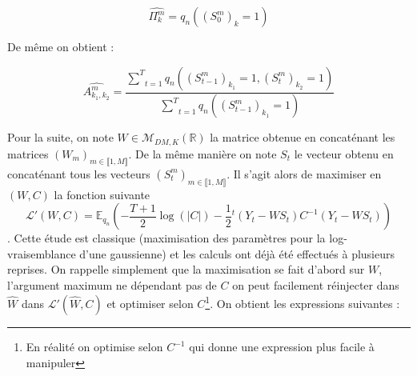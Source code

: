 \documentclass[10pt,a4paper]{article}
\begin{document}
\begin{equation}
  \widehat{\Pi_k^m}=q_{n}((S_0^m)_k=1)
\end{equation}

De même on obtient :

\begin{equation}
  \widehat{A_{k_1,k_2}^m}=\frac{\underset{t=1}{\overset{T}{\sum}}q_n((S_{t-1}^m)_{
  k_1}=1,(S_t^m)_{k_2}=1)}{\underset{t=1}{\overset{T}{\sum}}q_n((S_{t-1}^m)_{k_1}
  =1)}
\end{equation}

  Pour la suite, on note $W \in \mathcal{M}_{DM,K}(\mathbb{R})$ la matrice 
obtenue en concaténant les matrices $(W_m)_{m \in \llbracket 1,M \rrbracket}$. 
De la même manière on note $S_t$ le vecteur obtenu en concaténant tous les 
vecteurs $(S_t^m)_{m \in \llbracket 1,M \rrbracket}$.
Il s'agit alors de maximiser en $(W,C)$ la fonction suivante 
\[ \mathcal{L}'(W,C)=\mathbb{E}_{q_n}\left(-\frac{T+1}{2} \log(\vert C \vert) 
-\frac{1}{2} {}^t\left(Y_t-WS_t \right)C^{-1} \left( Y_t-WS_t\right)\right) \].
Cette étude est classique (maximisation des paramètres pour la 
log-vraisemblance d'une gaussienne) et les calculs ont déjà été effectués à 
plusieurs reprises.
On rappelle simplement que la maximisation se fait d'abord sur $W$, l'argument
maximum ne dépendant pas de $C$ on peut facilement réinjecter dans
$\widehat{W}$ dans $\mathcal{L}'(\widehat{W},C)$ et optimiser selon
$C$\footnote{En réalité on optimise selon $C^{-1}$ qui donne une 
expression plus facile à manipuler}.
On obtient les expressions suivantes :
\end{document}
